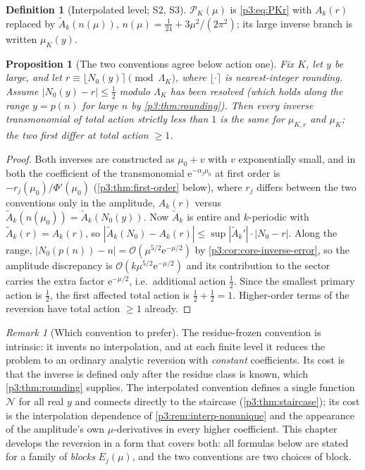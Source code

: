 \documentclass[11pt,a4paper,oneside]{book}
\theoremstyle{plain}
\newtheorem{proposition}[theorem]{Proposition}
\theoremstyle{definition}
\newtheorem{definition}[theorem]{Definition}
\theoremstyle{remark}
\newtheorem{remark}[theorem]{Remark}
\newcommand{\e}{\mathrm{e}}
\newcommand{\bigO}{\mathcal{O}}
\begin{document}
\begin{definition}[Interpolated level; S2, S3]\label{p3:def:interpolated}
$\mathcal{P}_{K}(\mu)$ is \cref{p3:eq:PKr} with $A_{k}(r)$ replaced by $\widetilde A_{k}(n(\mu))$,
$n(\mu)=\tfrac1{24}+3\mu^{2}/(2\pi^{2})$; its large inverse branch is written $\mu_{K}(y)$.
\end{definition}

\begin{proposition}[The two conventions agree below action one]
\label{p3:prop:two-conventions}
Fix $K$, let $y$ be large, and let $r\equiv\lfloor N_{0}(y)\rceil \pmod{\Lambda_{K}}$, where
$\lfloor\cdot\rceil$ is nearest-integer rounding. Assume $|N_{0}(y)-r|\le\tfrac12$ modulo
$\Lambda_{K}$ has been resolved (which holds along the range $y=p(n)$ for large $n$ by
\cref{p3:thm:rounding}). Then every inverse transmonomial of total action strictly less than $1$
is the same for $\mu_{K,r}$ and $\mu_{K}$; the two first differ at total action $\ge1$.
\end{proposition}

\begin{proof}
Both inverses are constructed as $\mu_{0}+v$ with $v$ exponentially small, and in both the
coefficient of the transmonomial $\e^{-\alpha_{j}\mu_{0}}$ at first order is
$-r_{j}(\mu_{0})/\Phi'(\mu_{0})$ (\cref{p3:thm:first-order} below), where $r_{j}$ differs between
the two conventions only in the amplitude, $A_{k}(r)$ versus $\widetilde
A_{k}(n(\mu_{0}))=\widetilde A_{k}(N_{0}(y))$. Now $\widetilde A_{k}$ is entire and $k$-periodic
with $\widetilde A_{k}(r)=A_{k}(r)$, so $|\widetilde A_{k}(N_{0})-A_{k}(r)|\le \sup|\widetilde
A_{k}'|\cdot|N_{0}-r|$. Along the range, $|N_{0}(p(n))-n|=\bigO(\mu^{5/2}\e^{-\mu/2})$ by
\cref{p3:cor:core-inverse-error}, so the amplitude discrepancy is
$\bigO(k\mu^{5/2}\e^{-\mu/2})$ and its contribution to the sector carries the extra factor
$\e^{-\mu/2}$, i.e.\ additional action $\tfrac12$. Since the smallest primary action is
$\tfrac12$, the first affected total action is $\tfrac12+\tfrac12=1$. Higher-order terms of the
reversion have total action $\ge1$ already.
\end{proof}

\begin{remark}[Which convention to prefer]\label{p3:rem:which-convention}
The residue-frozen convention is intrinsic: it invents no interpolation, and at each finite level
it reduces the problem to an ordinary analytic reversion with \emph{constant} coefficients. Its
cost is that the inverse is defined only after the residue class is known, which
\cref{p3:thm:rounding} supplies. The interpolated convention defines a single function
$\mathcal{N}$ for all real $y$ and connects directly to the staircase (\cref{p3:thm:staircase});
its cost is the interpolation dependence of \cref{p3:rem:interp-nonunique} and the appearance of
the amplitude's own $\mu$-derivatives in every higher coefficient. This chapter develops the
reversion in a form that covers both: all formulas below are stated for a family of \emph{blocks}
$E_{j}(\mu)$, and the two conventions are two choices of block.
\end{remark}
\end{document}
